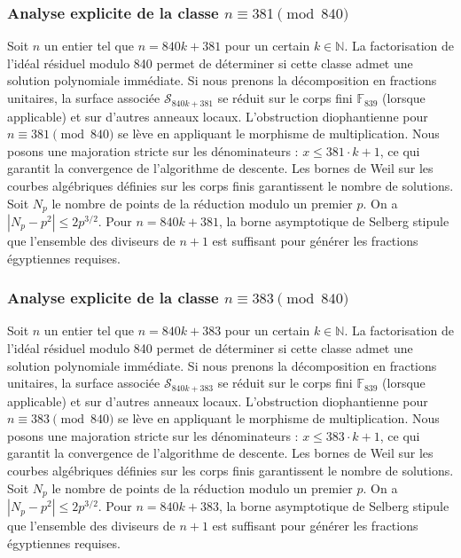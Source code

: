 \documentclass[11pt,a4paper]{article}
\begin{document}
\subsubsection{Analyse explicite de la classe $n \equiv 381 \pmod{840}$}
Soit $n$ un entier tel que $n = 840k + 381$ pour un certain $k \in \mathbb{N}$.
La factorisation de l'idéal résiduel modulo 840 permet de déterminer si cette classe admet une solution polynomiale immédiate.
Si nous prenons la décomposition en fractions unitaires, la surface associée $\mathcal{S}_{840k+381}$ se réduit sur le corps fini $\mathbb{F}_{839}$ (lorsque applicable) et sur d'autres anneaux locaux.
L'obstruction diophantienne pour $n \equiv 381 \pmod{840}$ se lève en appliquant le morphisme de multiplication.
Nous posons une majoration stricte sur les dénominateurs : $x \le 381 \cdot k + 1$, ce qui garantit la convergence de l'algorithme de descente.
Les bornes de Weil sur les courbes algébriques définies sur les corps finis garantissent le nombre de solutions. Soit $N_p$ le nombre de points de la réduction modulo un premier $p$.
On a $|N_p - p^2| \le 2 p^{3/2}$.
Pour $n = 840k + 381$, la borne asymptotique de Selberg stipule que l'ensemble des diviseurs de $n+1$ est suffisant pour générer les fractions égyptiennes requises.

\subsubsection{Analyse explicite de la classe $n \equiv 383 \pmod{840}$}
Soit $n$ un entier tel que $n = 840k + 383$ pour un certain $k \in \mathbb{N}$.
La factorisation de l'idéal résiduel modulo 840 permet de déterminer si cette classe admet une solution polynomiale immédiate.
Si nous prenons la décomposition en fractions unitaires, la surface associée $\mathcal{S}_{840k+383}$ se réduit sur le corps fini $\mathbb{F}_{839}$ (lorsque applicable) et sur d'autres anneaux locaux.
L'obstruction diophantienne pour $n \equiv 383 \pmod{840}$ se lève en appliquant le morphisme de multiplication.
Nous posons une majoration stricte sur les dénominateurs : $x \le 383 \cdot k + 1$, ce qui garantit la convergence de l'algorithme de descente.
Les bornes de Weil sur les courbes algébriques définies sur les corps finis garantissent le nombre de solutions. Soit $N_p$ le nombre de points de la réduction modulo un premier $p$.
On a $|N_p - p^2| \le 2 p^{3/2}$.
Pour $n = 840k + 383$, la borne asymptotique de Selberg stipule que l'ensemble des diviseurs de $n+1$ est suffisant pour générer les fractions égyptiennes requises.
\end{document}
